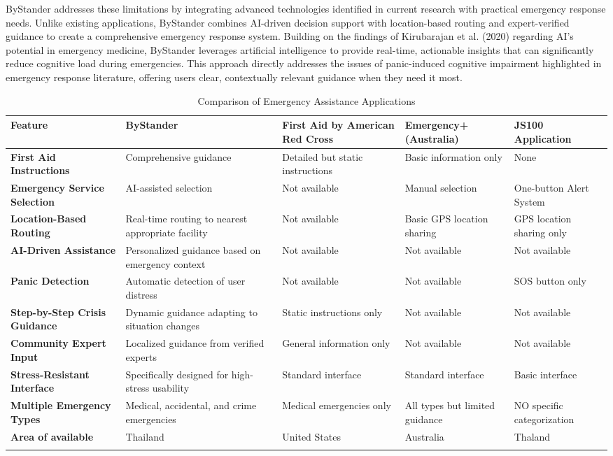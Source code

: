 ByStander addresses these limitations by integrating advanced technologies identified in current research with practical emergency response needs. Unlike existing applications, ByStander combines AI-driven decision support with location-based routing and expert-verified guidance to create a comprehensive emergency response system. Building on the findings of Kirubarajan et al. (2020) regarding AI's potential in emergency medicine, ByStander leverages artificial intelligence to provide real-time, actionable insights that can significantly reduce cognitive load during emergencies. This approach directly addresses the issues of panic-induced cognitive impairment highlighted in emergency response literature, offering users clear, contextually relevant guidance when they need it most.

\begin{longtable}{|p{3cm}|p{3cm}|p{3cm}|p{3cm}|p{3cm}|}
    \hline
    \textbf{Feature} & \textbf{ByStander} & \textbf{First Aid by American Red Cross} & \textbf{Emergency+ (Australia)} & \textbf{JS100 Application} \\
    \hline
    \textbf{First Aid Instructions} & Comprehensive guidance & Detailed but static instructions & Basic information only & None \\
    \hline
    \textbf{Emergency Service Selection} & AI-assisted selection & Not available & Manual selection & One-button Alert System \\
    \hline
    \textbf{Location-Based Routing} & Real-time routing to nearest appropriate facility & Not available & Basic GPS location sharing & GPS location sharing only \\
    \hline
    \textbf{AI-Driven Assistance} & Personalized guidance based on emergency context & Not available & Not available & Not available \\
    \hline
    \textbf{Panic Detection} & Automatic detection of user distress & Not available & Not available & SOS button only \\
    \hline
    \textbf{Step-by-Step Crisis Guidance} & Dynamic guidance adapting to situation changes & Static instructions only & Not available & Not available \\
    \hline
    \textbf{Community Expert Input} & Localized guidance from verified experts & General information only & Not available & Not available \\
    \hline
    \textbf{Stress-Resistant Interface} & Specifically designed for high-stress usability & Standard interface & Standard interface & Basic interface \\
    \hline
    \hline
    \textbf{Multiple Emergency Types} & Medical, accidental, and crime emergencies & Medical emergencies only & All types but limited guidance & NO specific categorization \\
    \hline
    \textbf{Area of available} & Thailand & United States & Australia & Thaland \\
    \hline
\caption{Comparison of Emergency Assistance Applications}
\label{tab:competitor-analysis}
\end{longtable}
    
